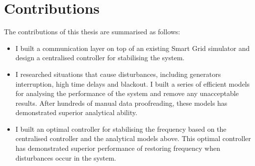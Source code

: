 \section{Contributions} %
The contributions of this thesis are summarised as follows: 
\begin{itemize}
  \item I built a communication layer on top of an existing Smart Grid simulator and design a centralised controller for stabilising the system. 
  
  \item I researched situations that cause disturbances, including generators interruption, high time delays and blackout. I built a series of efficient models for analysing the performance of the system and remove any unacceptable results. After hundreds of manual data proofreading, these models has demonstrated superior analytical ability. 
  
  \item I built an optimal controller for stabilising the frequency based on the centralised controller and the analytical models above. This optimal controller has demonstrated superior performance of restoring frequency when disturbances occur in the system. 
\end{itemize}